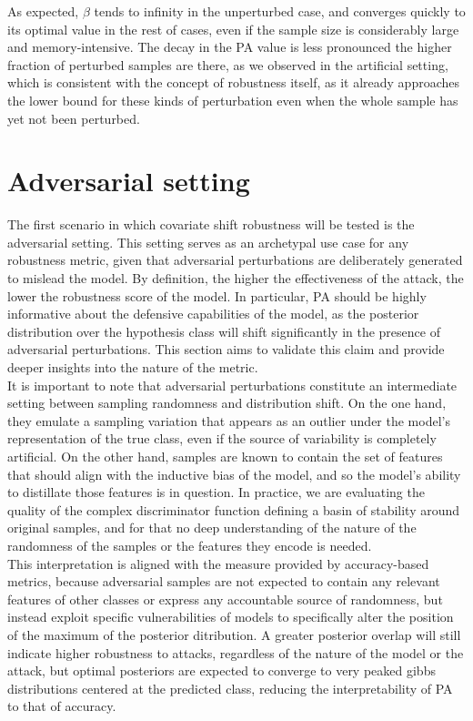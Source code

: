 As expected, $\beta$ tends to infinity in the unperturbed case, and converges
quickly to its optimal value in the rest of cases, even if the sample size is considerably
large and memory-intensive. The decay in the PA value is less pronounced the higher
fraction of perturbed samples are there, as we observed in the artificial setting, which
is consistent with the concept of robustness itself, as it already approaches
the lower bound for these kinds of perturbation even when the whole sample has yet not
been perturbed. \\

\section{Adversarial setting}\label{sec:results_adversarial}

The first scenario in which covariate shift robustness will be tested is the
adversarial setting. This setting serves as an archetypal 
use case for any robustness metric, given that adversarial perturbations are
deliberately generated to mislead the model. By definition, the higher the
effectiveness of the attack, the lower the robustness score of the model. In particular, 
PA should be highly informative about the defensive capabilities of the model, as the posterior 
distribution over the hypothesis class will shift significantly in the 
presence of adversarial perturbations. This section aims to validate 
this claim and provide deeper insights into the nature of the metric. \\

It is important to note that adversarial perturbations constitute an
intermediate setting between sampling randomness and distribution shift. 
On the one hand, they emulate a sampling variation that appears 
as an outlier under the model's representation of the true class, even if
the source of variability is completely artificial. On the other
hand, samples are known to contain the set of features that should 
align with the inductive bias of the model, and so the model's ability to 
distillate those features is in question. In practice, we are evaluating the 
quality of the complex discriminator function defining a basin of stability
around original samples, and for that no deep understanding of the nature of 
the randomness of the samples or the features they encode is needed.\\

This interpretation is aligned with the measure provided by accuracy-based metrics, 
because adversarial samples are not expected to contain any relevant features of other
classes or express any accountable source of randomness, but instead exploit specific
vulnerabilities of models to specifically alter the position of the maximum of 
the posterior ditribution. A greater posterior overlap will still
indicate higher robustness to attacks, regardless of the nature of the model or the
attack, but optimal posteriors are expected to converge to very peaked gibbs
distributions centered at the predicted class, reducing the interpretability of PA
to that of accuracy. \\

